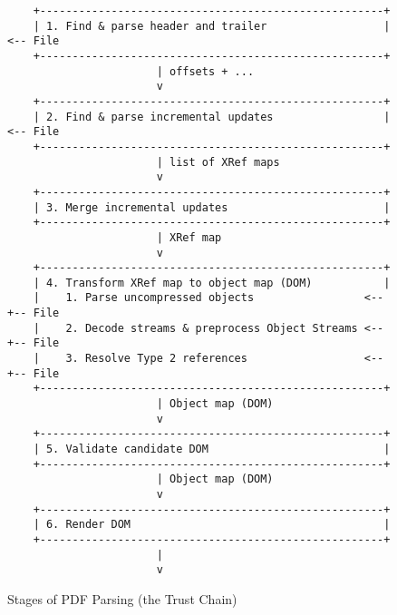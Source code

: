 \begin{figure}[t]
  \centering
  \begin{lstlisting}
    +-----------------------------------------------------+
    | 1. Find & parse header and trailer                  |<-- File
    +-----------------------------------------------------+
                       | offsets + ...
                       v
    +-----------------------------------------------------+
    | 2. Find & parse incremental updates                 |<-- File
    +-----------------------------------------------------+
                       | list of XRef maps
                       v
    +-----------------------------------------------------+
    | 3. Merge incremental updates                        |
    +-----------------------------------------------------+
                       | XRef map
                       v
    +-----------------------------------------------------+
    | 4. Transform XRef map to object map (DOM)           |
    |    1. Parse uncompressed objects                 <--+-- File
    |    2. Decode streams & preprocess Object Streams <--+-- File
    |    3. Resolve Type 2 references                  <--+-- File
    +-----------------------------------------------------+
                       | Object map (DOM)
                       v
    +-----------------------------------------------------+
    | 5. Validate candidate DOM                           |
    +-----------------------------------------------------+
                       | Object map (DOM)                                    
                       v
    +-----------------------------------------------------+
    | 6. Render DOM                                       |
    +-----------------------------------------------------+
                       | 
                       v
  \end{lstlisting}
  \caption{Stages of PDF Parsing (the Trust Chain)}
  \label{fig:pdf-trust-chain}
\end{figure}

